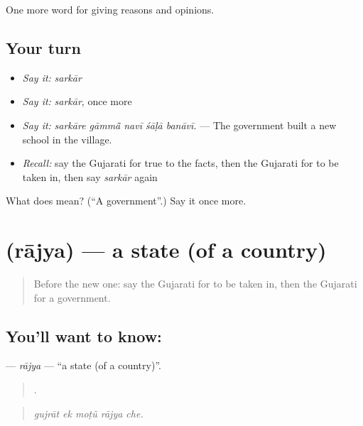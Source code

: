 \begin{grammarlens}[title={What you've built}]
One more word for giving reasons and opinions.
\end{grammarlens}

\subsection*{Your turn}
\begin{itemize}
\raggedright
  \item \emph{Say it:} \emph{sarkār}
  \item \emph{Say it:} \emph{sarkār}, once more
  \item \emph{Say it:} \emph{sarkāre gāmmā̃ navī śāḷā banāvī.} — The government built a new school in the village.
  \item \emph{Recall:} say the Gujarati for true to the facts, then the Gujarati for to be taken in, then say \emph{sarkār} again
\end{itemize}

\begin{tcolorbox}[breakable,colback=teal!4,colframe=teal!35!black,title={Before you move on}]
What does  mean? (\textquotedblleft{}A government\textquotedblright{}.) Say it once more.
\end{tcolorbox}
\section[\texorpdfstring{\gu{રાજ્ય} (rājya)}{રાજ્ય (rājya)}]{ (rājya) — a state (of a country)}

\label{lesson:GU-C352-rajya}



\begin{quote}
Before the new one: say the Gujarati for to be taken in, then the Gujarati for a government.
\end{quote}

\subsection*{You'll want to know: }
\textbf{} — \emph{rājya} — \textquotedblleft{}a state (of a country)\textquotedblright{}.

\begin{quote}
    .
\end{quote}

\begin{quote}
\emph{gujrāt ek moṭũ rājya che.}
\end{quote}

